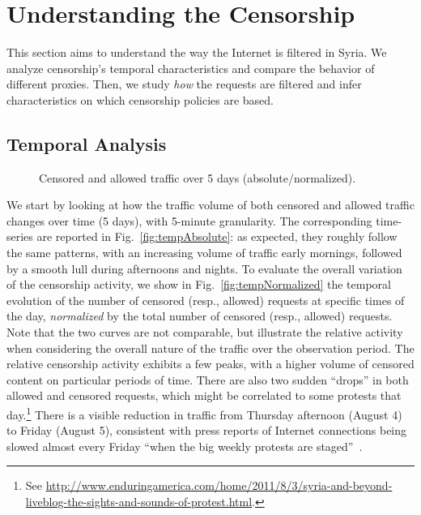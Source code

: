 \documentclass{sig-alternate-2013}
\begin{document}
\section{Understanding the Censorship}
\label{sec:understanding_censorhip}

This section aims to understand the way the Internet is filtered in Syria.
We analyze censorship's temporal characteristics and compare the behavior of different proxies. Then, we study {\em how} the requests are filtered and infer characteristics on which censorship policies are based. 

\subsection{Temporal Analysis}\label{subsec:temporal}


\begin{figure}[t!]
  \centering
        \vspace{-0.2cm}
\caption{Censored and allowed traffic over 5 days (absolute/normalized). }
\label{fig:temp5days}
\end{figure}

We start by looking at how the traffic volume of both censored and allowed traffic changes over time (5 days), with 5-minute granularity. The corresponding time-series are reported in Fig.~\ref{fig:tempAbsolute}:
as expected, they roughly follow the same patterns, with an increasing volume of traffic early mornings, followed by a smooth lull 
during afternoons and nights.
To evaluate the overall variation of the censorship activity, we show in Fig.~\ref{fig:tempNormalized} the temporal evolution of the number of censored (resp., allowed) requests at specific times of the day, {\em normalized} by the total number of censored (resp., allowed) requests. Note that the two curves are not comparable, but illustrate the relative activity when considering the overall nature of the traffic over the observation period. The relative censorship activity exhibits a few peaks, with a higher volume of censored content on particular periods of time. There are also two sudden ``drops'' in both allowed and censored requests, which might be correlated to some protests that day.\footnote{See
\url{http://www.enduringamerica.com/home/2011/8/3/syria-and-beyond-liveblog-the-sights-and-sounds-of-protest.html}.}  
There is a visible reduction in traffic from  Thursday afternoon (August 4) to Friday (August 5), consistent with press reports of Internet connections being slowed almost every Friday ``when the big weekly protests are staged''~\cite{RWB}.
\end{document}
